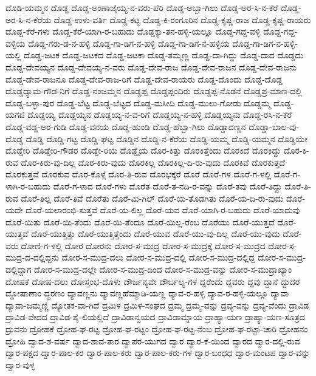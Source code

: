 ದೊಡಿ-ಯಮ್ಮನ
ದೊಡ್ಡ
ದೊಡ್ಡ-ಅಂಣಾಜೈಯ್ಯ-ನ-ವರು-ಪೆರಿ
ದೊಡ್ಡ-ಅಬ್ಬಾ-ಗಿಲು
ದೊಡ್ಡ-ಅರ-ಸಿ-ನ-ಕೆರೆ
ದೊಡ್ಡ-ಅರ-ಸಿ-ನ-ಕೆರೆಯ
ದೊಡ್ಡ-ಉಳು-ವರ್ತಿ
ದೊಡ್ಡ-ಕಟ್ಟ
ದೊಡ್ಡ-ಕಿ-ರಂಗೂರಿನ
ದೊಡ್ಡ-ಕೃಷ್ಣ-ರಾಜ
ದೊಡ್ಡ-ಕೃಷ್ಣ-ರಾಯರು
ದೊಡ್ಡ-ಕೆರೆ-ಗಳು
ದೊಡ್ಡ-ಕೆರೆ-ಯಾಗಿ-ರ-ಬಹುದು
ದೊಡ್ಡಕ್ಯಾ-ತನ-ಹಳ್ಳಿ-ಯಲ್ಲೂ
ದೊಡ್ಡ-ಗದ್ದ-ವಳ್ಳಿ
ದೊಡ್ಡ-ಗದ್ದ-ವಳ್ಳಿಯ
ದೊಡ್ಡ-ಗರು-ಡ-ನ-ಹಳ್ಳಿ
ದೊಡ್ಡ-ಗಾ-ಡಿಗ-ನ-ಹಳ್ಳಿ
ದೊಡ್ಡ-ಗಾ-ಡಿಗ-ನ-ಹಳ್ಳಿಯ
ದೊಡ್ಡ-ಗಾ-ಡಿಗ-ನ-ಹಳ್ಳಿ-ಯಲ್ಲಿ
ದೊಡ್ಡ-ಜಟಕ
ದೊಡ್ಡ-ಜಟಕದ
ದೊಡ್ಡ-ಜಟಕಾ
ದೊಡ್ಡ-ತಮ್ಮಣ್ಣ
ದೊಡ್ಡ-ದಾ-ಗಿದ್ದು
ದೊಡ್ಡ-ದಾದ
ದೊಡ್ಡದು
ದೊಡ್ಡ-ದೇವಯ್ಯನ
ದೊಡ್ಡ-ದೇವಯ್ಯ-ನ-ವರು
ದೊಡ್ಡ-ದೇವ-ರಾಜ
ದೊಡ್ಡ-ದೇವ-ರಾಜನ
ದೊಡ್ಡ-ದೇವ-ರಾಜನು
ದೊಡ್ಡ-ದೇವ-ರಾಜನೂ
ದೊಡ್ಡ-ದೇವ-ರಾಜ-ರಿಗೆ
ದೊಡ್ಡ-ದೇವ-ರಾಯರು
ದೊಡ್ಡ-ದೊಂದು
ದೊಡ್ಡ-ದೊಡ್ಡ
ದೊಡ್ಡದ್ಯಾಮ-ಗೌಡ-ನಿಗೆ
ದೊಡ್ಡ-ನಂಜಮ್ಮನ
ದೊಡ್ಡಪ್ಪ
ದೊಡ್ಡಪ್ಪಂದಿರು
ದೊಡ್ಡಪ್ಪ-ನೊಡನೆ
ದೊಡ್ಡಪ್ರ-ಮಾಣ-ದಲ್ಲಿ
ದೊಡ್ಡ-ಬಳ್ಳಾ-ಪುರ
ದೊಡ್ಡ-ಬೆಟ್ಟ
ದೊಡ್ಡ-ಬೆಟ್ಟದ
ದೊಡ್ಡ-ಮಸೀದಿ
ದೊಡ್ಡ-ಮುಲು-ಗೋಡು
ದೊಡ್ಡಮ್ಮ
ದೊಡ್ಡ-ಯಗಟಿ
ದೊಡ್ಡಯ್ಯ
ದೊಡ್ಡಯ್ಯನ
ದೊಡ್ಡಯ್ಯ-ನ-ವ-ರಿಗೆ
ದೊಡ್ಡಯ್ಯ-ನ-ಹಳ್ಳಿ
ದೊಡ್ಡಯ್ಯನು
ದೊಡ್ಡ-ರಸಿ-ನ-ಕೆರೆ
ದೊಡ್ಡ-ವಡ್ಡ-ಅರ-ಗುಡಿ
ದೊಡ್ಡ-ವನಯ
ದೊಡ್ಡ-ಹುಂಡಿ
ದೊಡ್ಡ-ಹೆಬ್ಬಾ-ಗಿಲು
ದೊಡ್ಡಾದಣ್ಣನ
ದೊಡ್ಡಾ-ಬಾಲ-ವು-ದೊಡ್ಡ
ದೊಡ್ಡಿ
ದೊಡ್ಡಿ-ಗಟ್ಟ
ದೊಡ್ಡಿ-ಘಟ್ಟ
ದೊಡ್ಡಿನ
ದೊಡ್ಡಿ-ನ-ಕೆರೆಯ
ದೊಡ್ಡಿ-ಯಮ್ಮ
ದೊಡ್ಡಿ-ಯಮ್ಮನ
ದೊಡ್ಡಿಯೇ
ದೊಡ್ಡೇರಿ
ದೊಡ್ಡೇರಿ-ಗೌಡರ
ದೊಡ್ಡೇ-ರಿಯ
ದೊಡ್ಡೈಯ
ದೊರ-ಕಿತ್ತು
ದೊರಕಿತ್ತೆಂದು
ದೊರಕಿದೆ
ದೊರಕಿದ್ದು
ದೊರ-ಕಿ-ರುವ
ದೊರ-ಕಿರು-ವು-ದಿಲ್ಲ
ದೊರ-ಕಿರು-ವುದು
ದೊರಕಿಲ್ಲ
ದೊರಕಿಲ್ಲ-ದಿ-ರು-ವುದು
ದೊರಕಿವೆ
ದೊರಕುತ್ತದೆ
ದೊರಕುತ್ತವೆ
ದೊರಕುವ
ದೊರ-ಕೊಳ್ಗೆ
ದೊರ-ತಿ-ರುವ
ದೊರಭಕ್ಕೆರೆ
ದೊರೆ
ದೊರೆ-ಗಳ
ದೊರೆ-ಗ-ಳಲ್ಲಿ
ದೊರೆ-ಗ-ಳಾಗಿ-ರ-ಬಹುದು
ದೊರೆ-ಗ-ಳಾದ
ದೊರೆ-ಗಳು
ದೊರೆತ
ದೊರೆ-ತ-ನದಿ-ರ-ವನ್ನು
ದೊರೆ-ತವು
ದೊರೆ-ತಿದ್ದು
ದೊರೆ-ತಿ-ರುವ
ದೊರೆ-ತಿಲ್ಲ
ದೊರೆ-ತಿವೆ
ದೊರೆತು
ದೊರೆ-ಮಿ-ಗಿಲ್
ದೊರೆ-ಯ-ತೊಡಗಿತು
ದೊರೆ-ಯ-ದಿ-ರು-ವುದು
ದೊರೆ-ಯದೇ
ದೊರೆ-ಯಲಾರಂಭಿ-ಸುತ್ತವೆ
ದೊರೆ-ಯ-ಲಿಲ್ಲ
ದೊರೆ-ಯವ
ದೊರೆ-ಯಾಗಿ-ರ-ಬಹುದು
ದೊರೆ-ಯಾದುವು
ದೊರೆ-ಯಿತು
ದೊರೆ-ಯಿ-ತೆಂದು
ದೊರೆ-ಯಿ-ತೆಂದೂ
ದೊರೆ-ಯಿಲ್ಲ-ರೆಂಬ
ದೊರೆಯು
ದೊರೆ-ಯುತ್ತದೆ
ದೊರೆ-ಯುತ್ತವೆ
ದೊರೆ-ಯುತ್ತಿತ್ತು
ದೊರೆ-ಯುತ್ತಿತ್ತೆಂದು
ದೊರೆ-ಯುವ
ದೊರೆ-ಯು-ವು-ದಿಲ್ಲ
ದೊರೆ-ಯು-ವುದು
ದೊರೆ-ವರು
ದೋಣಿ-ಗ-ಳಲ್ಲಿ
ದೋರ
ದೋರನು
ದೋರ-ಸ-ಮುದ್ರ
ದೋರ-ಸ-ಮುದ್ರಕ್ಕೆ
ದೋರ-ಸ-ಮುದ್ರದ
ದೋರ-ಸ-ಮುದ್ರ-ದ-ದಲ್ಲಿದ್ದನು
ದೋರ-ಸ-ಮುದ್ರ-ದಲು
ದೋರ-ಸ-ಮುದ್ರ-ದಲ್ಲಿ
ದೋರ-ಸ-ಮುದ್ರ-ದಲ್ಲಿದ್ದ
ದೋರ-ಸ-ಮುದ್ರ-ದಲ್ಲಿದ್ದಾಗ
ದೋರ-ಸ-ಮುದ್ರ-ದಲ್ಲೇ
ದೋರ-ಸ-ಮುದ್ರ-ದಿಂದ
ದೋರ-ಸ-ಮುದ್ರ-ವನ್ನು
ದೋರ-ಸ-ಮುದ್ರಾಖ್ಯಾಂ
ದೋಷಕೆ
ದೋಷ-ದಲು
ದೋಸ್ತಂಭ-ದೊಳು
ದೌರ್ಜನ್ಯವೇ
ದೌರ್ಬಲ್ಯ-ಗಳ
ದ್ದರೆಂದು
ದ್ದವರು
ದ್ದವು
ದ್ದಾನೆ
ದ್ದುದರ
ದ್ದೋಷಾಣಾಂ
ದ್ಧರಣಂ
ದ್ಯಾವಣ್ಣನು
ದ್ಯಾವಣ್ಣಹೆಮ್ಮಾಡಿ-ಯಣ್ಣ
ದ್ಯಾವ-ರ-ಹಳ್ಳಿ
ದ್ಯಾವ-ರ-ಹಳ್ಳಿ-ಯಲ್ಲೂ
ದ್ಯಾವಾ
ದ್ಯಾವಾ-ಜಮ್ಮಣ್ಣಿ
ದ್ಯೋತಕ-ವಾ-ಗಿದೆ
ದ್ರಮಿಳ
ದ್ರಮಿಳ-ಸಂಘದ
ದ್ರಮ್ಮ
ದ್ರಮ್ಮ-ವನ್ನು
ದ್ರವ್ಯ-ವನ್ನು
ದ್ರವ್ಯ-ವೆಂದು
ದ್ರಾವಿಡ
ದ್ರಾವಿಡ-ವೇದದ
ದ್ರಾವಿಡ-ಶೈ-ಲಿಯಲ್ಲಿದೆ
ದ್ರಾವಿಡಾನ್ವಯದ
ದ್ರಾವಿಡಾಮ್ನಾಯ
ದ್ರಾಹ್ಯಾ-ಯಣ
ದ್ರಾಹ್ಯಾ-ಯಣ-ಸೂತ್ರದ
ದ್ರುವನು
ದ್ರೋಹಕೆ
ದ್ರೋಹ-ಘ-ರಟ್ಟ
ದ್ರೋಹ-ಘ-ರಟ್ಟಂ
ದ್ರೋಹ-ಘ-ರಟ್ಟ-ನೆಂಬ
ದ್ರೋಹ-ಘ-ರಟ್ಟಾ-ಚಾರಿ
ದ್ರೋಹನಂ
ದ್ರೋಹಿ
ದ್ವಾದ-ಶ-ವರ್ಷ
ದ್ವಾದ-ಶಾವ-ತಾರ
ದ್ವಾಪರ-ಯುಗದ
ದ್ವಾರ
ದ್ವಾರ-ಕೆ-ಯಿಂದ
ದ್ವಾರದ
ದ್ವಾರ-ದಲ್ಲಿ-ರುವ
ದ್ವಾರ-ಪಕ್ಷದ
ದ್ವಾರ-ಪಾಲ-ಕರ
ದ್ವಾರ-ಪಾಲ-ಕರು
ದ್ವಾರ-ಪಾಲ-ಕರು-ಗಳ
ದ್ವಾರ-ಬಂಧಧ
ದ್ವಾರ-ಮಂಟಪ
ದ್ವಾರ-ವನ್ನು
ದ್ವಾರ-ವುಳ್ಳ
